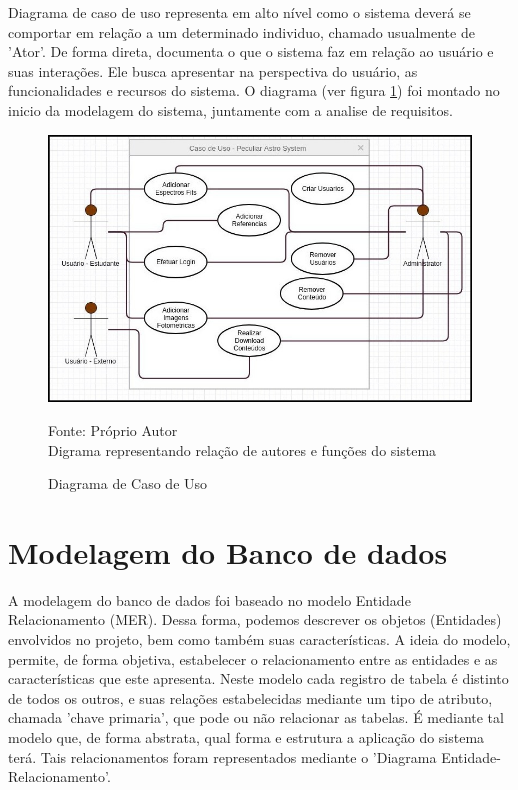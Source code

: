 Diagrama de caso de uso representa em alto nível como o sistema deverá se comportar em relação a um determinado individuo, chamado usualmente de 'Ator'. De forma direta, documenta o que o sistema faz em relação ao usuário e suas interações. Ele busca apresentar na perspectiva do usuário, as funcionalidades e recursos do sistema. O diagrama (ver figura \ref{fig:uso}) foi montado no inicio da modelagem do sistema, juntamente com a analise de requisitos.

\begin{figure}[H]
	\centering	
    \caption{Diagrama de Caso de Uso}
    \includegraphics[width=1.0\textwidth]{figuras/caso_de_uso.png}
   	\begin{center}
        \normalsize Fonte: Próprio Autor \\Digrama representando relação de autores e funções do sistema
    \end{center}
	\label{fig:uso}
\end{figure}

\section{Modelagem do Banco de dados}

A modelagem do banco de dados foi baseado no modelo Entidade Relacionamento (MER). Dessa forma, podemos descrever os objetos (Entidades) envolvidos no projeto, bem como também suas características. A ideia do modelo, permite, de forma objetiva, estabelecer o relacionamento entre as entidades e as características que este apresenta. Neste modelo cada registro de tabela é distinto de todos os outros, e suas relações estabelecidas mediante um tipo de atributo, chamada 'chave primaria', que pode ou não relacionar as tabelas.  É mediante tal modelo que, de forma abstrata, qual forma e estrutura a aplicação do sistema terá. Tais relacionamentos foram representados mediante o 'Diagrama Entidade-Relacionamento'. 

